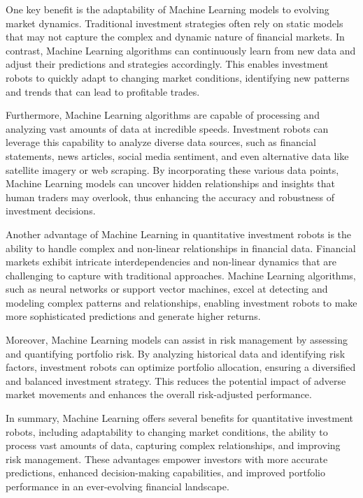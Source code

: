 \documentclass[UTF8]{ctexart}
\begin{document}
One key benefit is the adaptability of Machine Learning models to evolving market dynamics. Traditional investment strategies often rely on static models that may not capture the complex and dynamic nature of financial markets. In contrast, Machine Learning algorithms can continuously learn from new data and adjust their predictions and strategies accordingly. This enables investment robots to quickly adapt to changing market conditions, identifying new patterns and trends that can lead to profitable trades.

Furthermore, Machine Learning algorithms are capable of processing and analyzing vast amounts of data at incredible speeds. Investment robots can leverage this capability to analyze diverse data sources, such as financial statements, news articles, social media sentiment, and even alternative data like satellite imagery or web scraping. By incorporating these various data points, Machine Learning models can uncover hidden relationships and insights that human traders may overlook, thus enhancing the accuracy and robustness of investment decisions.

Another advantage of Machine Learning in quantitative investment robots is the ability to handle complex and non-linear relationships in financial data. Financial markets exhibit intricate interdependencies and non-linear dynamics that are challenging to capture with traditional approaches. Machine Learning algorithms, such as neural networks or support vector machines, excel at detecting and modeling complex patterns and relationships, enabling investment robots to make more sophisticated predictions and generate higher returns.

Moreover, Machine Learning models can assist in risk management by assessing and quantifying portfolio risk. By analyzing historical data and identifying risk factors, investment robots can optimize portfolio allocation, ensuring a diversified and balanced investment strategy. This reduces the potential impact of adverse market movements and enhances the overall risk-adjusted performance.

In summary, Machine Learning offers several benefits for quantitative investment robots, including adaptability to changing market conditions, the ability to process vast amounts of data, capturing complex relationships, and improving risk management. These advantages empower investors with more accurate predictions, enhanced decision-making capabilities, and improved portfolio performance in an ever-evolving financial landscape.
\end{document}
